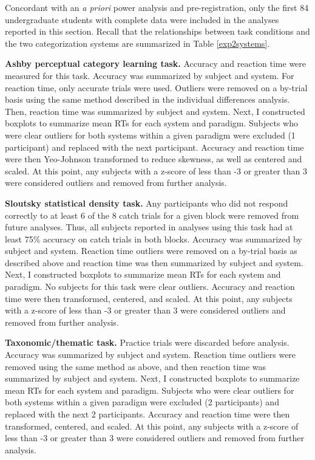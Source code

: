 \documentclass[../dissertation.tex]{subfiles}
\begin{document}
Concordant with an \textit{a priori} power analysis and pre-registration, only the first 84 undergraduate students with complete data were included in the analyses reported in this section. Recall that the relationships between task conditions and the two categorization systems are summarized in Table \ref{exp2systems}. \par
	\textbf{Ashby perceptual category learning task.} Accuracy and reaction time were measured for this task. Accuracy was summarized by subject and system. For reaction time, only accurate trials were used. Outliers were removed on a by-trial basis using the same method described in the individual differences analysis. Then, reaction time was summarized by subject and system. Next, I constructed boxplots to summarize mean RTs for each system and paradigm. Subjects who were clear outliers for both systems within a given paradigm were excluded (1 participant) and replaced with the next participant. Accuracy and reaction time were then Yeo-Johnson transformed to reduce skewness, as well as centered and scaled. At this point, any subjects with a z-score of less than -3 or greater than 3 were considered outliers and removed from further analysis. \par
	\textbf{Sloutsky statistical density task.} Any participants who did not respond correctly to at least 6 of the 8 catch trials for a given block were removed from future analyses. Thus, all subjects reported in analyses using this task had at least 75\% accuracy on catch trials in both blocks. Accuracy was summarized by subject and system. Reaction time outliers were removed on a by-trial basis as described above and reaction time was then summarized by subject and system. Next, I constructed boxplots to summarize mean RTs for each system and paradigm. No subjects for this task were clear outliers. Accuracy and reaction time were then transformed, centered, and scaled. At this point, any subjects with a z-score of less than -3 or greater than 3 were considered outliers and removed from further analysis. \par
	\textbf{Taxonomic/thematic task.} Practice trials were discarded before analysis. Accuracy was summarized by subject and system. Reaction time outliers were removed using the same method as above, and then reaction time was summarized by subject and system. Next, I constructed boxplots to summarize mean RTs for each system and paradigm. Subjects who were clear outliers for both systems within a given paradigm were excluded (2 participants) and replaced with the next 2 participants. Accuracy and reaction time were then transformed, centered, and scaled. At this point, any subjects with a z-score of less than -3 or greater than 3 were considered outliers and removed from further analysis. \par	
	
\end{document}
